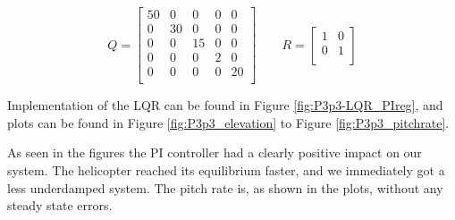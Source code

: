 \begin{equation}
  Q =
  \begin{bmatrix}
    50 & 0   & 0  & 0 & 0 \\
    0  & 30 & 0  & 0 & 0 \\
    0  & 0   & 15 & 0 & 0 \\
    0  & 0   & 0  & 2 & 0 \\
    0  & 0   & 0  & 0 & 20 \\
  \end{bmatrix}
  \qquad
  R =
  \begin{bmatrix}
    1 & 0 \\
    0 & 1 \\
  \end{bmatrix}
\end{equation}
\newline

Implementation of the LQR can be found in Figure \ref{fig:P3p3-LQR_PIreg}, and plots can be found in Figure \ref{fig:P3p3_elevation} to Figure \ref{fig:P3p3_pitchrate}. 

As seen in the figures the PI controller had a clearly positive impact on our system. The helicopter reached its equilibrium faster, and we immediately got a less underdamped system. The pitch rate is, as shown in the plots, without any steady state errors. 
